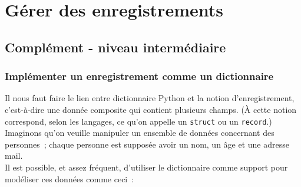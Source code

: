     \hypertarget{guxe9rer-des-enregistrements}{%
\section{Gérer des enregistrements}\label{guxe9rer-des-enregistrements}}

    \hypertarget{compluxe9ment---niveau-intermuxe9diaire}{%
\subsection{Complément - niveau
intermédiaire}\label{compluxe9ment---niveau-intermuxe9diaire}}

    \hypertarget{impluxe9menter-un-enregistrement-comme-un-dictionnaire}{%
\subsubsection{Implémenter un enregistrement comme un
dictionnaire}\label{impluxe9menter-un-enregistrement-comme-un-dictionnaire}}

    Il nous faut faire le lien entre dictionnaire Python et la notion
d'enregistrement, c'est-à-dire une donnée composite qui contient
plusieurs champs. (À cette notion correspond, selon les langages, ce
qu'on appelle un \texttt{struct} ou un \texttt{record}.)\\

Imaginons qu'on veuille manipuler un ensemble de données concernant des
personnes~; chaque personne est supposée avoir un nom, un âge et une
adresse mail.\\

Il est possible, et assez fréquent, d'utiliser le dictionnaire comme
support pour modéliser ces données comme ceci~:

